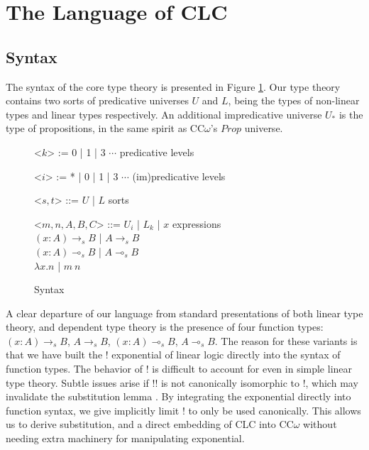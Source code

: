 \documentclass{article}
\theoremstyle{definition}
\newcommand{\indalt}[1][2]{\\\hspace*{-1.2em}\textbar\quad}
\begin{document}
  \section{The Language of CLC}

  \subsection{Syntax}
  The syntax of the core type theory is presented in Figure \ref{syntax}. Our type theory contains two sorts of predicative universes $U$ and $L$, being the types of non-linear types and linear types respectively. An additional impredicative universe $U_*$ is the type of propositions, in the same spirit as CC$\omega$'s $Prop$ universe.

  \begin{figure}[H]
    \caption{Syntax}
    \centering
    \begin{minipage}{0.8\linewidth}
    \begin{grammar}
      <$k$> := 0 | 1 | 3 $\cdots$ \hspace*{6.8em} predicative levels

      <$i$> := * | 0 | 1 | 3 $\cdots$ \hspace*{5.3em} (im)predicative levels

      <$s, t$> ::= $U$ | $L$ \phantom{| $x$} \hspace*{8em} sorts

      <$m, n, A, B, C$> ::= $U_i$ | $L_k$ | $x$ \hspace*{7.3em} expressions
      \indalt $(x : A) \rightarrow_s B$ | $A \rightarrow_s B$
      \indalt $(x : A) \multimap_s B$ | $A \multimap_s B$
      \indalt $\lambda x. n$ | $m\ n$
    \end{grammar}
    \end{minipage}
    \label{syntax}
  \end{figure}
  A clear departure of our language from standard presentations of both linear type theory, and dependent type theory is the presence of four function types: $(x : A) \rightarrow_s B$, $A \rightarrow_s B$, $(x : A) \multimap_s B$, $A \multimap_s B$. The reason for these variants is that we have built the ! exponential of linear logic directly into the syntax of function types. The behavior of ! is difficult to account for even in simple linear type theory. Subtle issues arise if !! is not canonically isomorphic to !, which may invalidate the substitution lemma \cite{substitute}. By integrating the exponential directly into function syntax, we give implicitly limit ! to only be used canonically. This allows us to derive substitution, and a direct embedding of CLC into CC$\omega$ without needing extra machinery for manipulating exponential.
\end{document}
